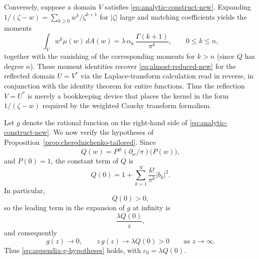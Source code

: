 Conversely, suppose a domain $V$ satisfies \eqref{eq:analytic-construct-new}. Expanding $1/(\zeta-w)=\sum_{k\ge 0}w^k/\zeta^{k+1}$ for $|\zeta|$ large and matching coefficients yields the moments
\[
\int_V w^k\mu(w)\,dA(w)=\lambda\,\alpha_k\,\frac{\Gamma(k+1)}{\pi^k},
\qquad 0\le k\le n,
\]
together with the vanishing of the corresponding moments for $k>n$ (since $Q$ has degree $n$). These moment identities recover \eqref{eq:almost-reduced-new} for the reflected domain \(U=V^\ast\) via the Laplace-transform calculation read in reverse, in conjunction with the identity theorem for entire functions. Thus the reflection \(V=U^\ast\) is merely a bookkeeping device that places the kernel in the form $1/(\zeta-w)$ required by the weighted Cauchy transform formalism.

Let $g$ denote the rational function on the right-hand side of \eqref{eq:analytic-construct-new}. We now verify the hypotheses of Proposition~\ref{prop:cherednichenko-tailored}. Since
\[
Q(w)=P^\#(\partial_w/\pi)\big(P(w)\big),
\]
and $P(0)=1$, the constant term of $Q$ is
\[
Q(0)=1+\sum_{k=1}^N \frac{k!}{\pi^k}|b_k|^2.
\]
In particular,
\[
Q(0)>0,
\]
so the leading term in the expansion of $g$ at infinity is
\[
\frac{\lambda Q(0)}{z},
\]
and consequently
\[
g(z)\to 0,
\qquad
z\,g(z)\to \lambda Q(0)>0
\qquad \text{as } z\to\infty.
\]
Thus \eqref{eq:appendix-g-hypotheses} holds, with $c_0=\lambda Q(0)$.

